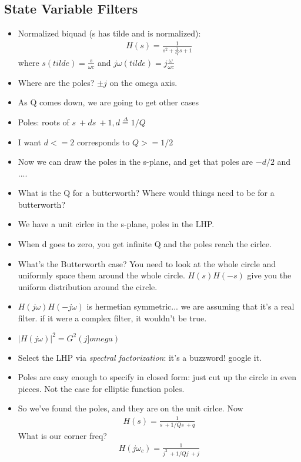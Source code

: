 \subsection*{State Variable Filters}

\begin{itemize}
\item{
Normalized biquad (s has tilde and is normalized): 
\begin{align*}
H(s) = \frac{1}{s^2 + \frac{1}{Q}s + 1}
\end{align*}
}
where $s (tilde) = \frac{s}{\omega c}$ and $j\omega (tilde) = j \frac{\omega}{\omega c}$

\item{
Where are the poles? $\pm j$ on the omega axis. 
}

\item{
As Q comes down, we are going to get other cases
}
\item{
Poles: roots of $s ~ + ds ~ + 1, d \stackrel{\Delta}{=} 1/Q$ 
}
\item{
I want $d <= 2$ corresponds to $Q >= 1/2$
}
\item{
Now we can draw the poles in the s-plane, and get that poles are 
$-d/2$ and ....
}
\item{
What is the Q for a butterworth? Where would things need to be for a butterworth?
}
\item{
We have a unit cirlce in the s-plane, poles in the LHP. 
}
\item{
When d goes to zero, you get infinite Q and the poles reach the cirlce. 
}
\item{
What's the Butterworth case? You need to look at the whole circle and
uniformly space them around the whole circle. $H(s)H(-s)$ give you
the uniform distribution around the circle. 
}
\item{
$H(j\omega)H(-j\omega)$ is hermetian symmetric... we are assuming that it's
a real filter. if it were a complex filter, it wouldn't be true. 
}
\item{
$\vert H(j\omega) \vert^2 = G^2(j]omega)$
}
\item{
Select the LHP via \textit{spectral factorization}: it's a buzzword! google it.
}
\item{
Poles are easy enough to specify in closed form: just cut up the circle in even pieces. 
Not the case for elliptic function poles. 
}
\item{
So we've found the poles, and they are on the unit cirlce. Now
\begin{align*}
H(s) = \frac{1}{s ~ + 1/Qs ~ + q}
\end{align*}
What is our corner freq? 
\begin{align*}
H(j\omega_c) = \frac{1}{j^2 ~ + 1/Qj ~ + j}
\end{align*}

}
\end{itemize}
